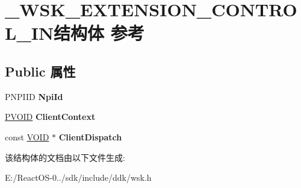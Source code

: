 \hypertarget{struct___w_s_k___e_x_t_e_n_s_i_o_n___c_o_n_t_r_o_l___i_n}{}\section{\+\_\+\+W\+S\+K\+\_\+\+E\+X\+T\+E\+N\+S\+I\+O\+N\+\_\+\+C\+O\+N\+T\+R\+O\+L\+\_\+\+I\+N结构体 参考}
\label{struct___w_s_k___e_x_t_e_n_s_i_o_n___c_o_n_t_r_o_l___i_n}
\subsection*{Public 属性}
\begin{DoxyCompactItemize}
\item 
\mbox{\label{struct___w_s_k___e_x_t_e_n_s_i_o_n___c_o_n_t_r_o_l___i_n_a98210ebe8b8c06548c340551e8f9b88a}} 
P\+N\+P\+I\+ID {\bfseries Npi\+Id}
\item 
\mbox{\label{struct___w_s_k___e_x_t_e_n_s_i_o_n___c_o_n_t_r_o_l___i_n_a6a78e0218d9c5d07c5f74e40bbae2557}} 
\hyperlink{interfacevoid}{P\+V\+O\+ID} {\bfseries Client\+Context}
\item 
\mbox{\label{struct___w_s_k___e_x_t_e_n_s_i_o_n___c_o_n_t_r_o_l___i_n_abd1c3264ee82e9b5da836b9fb04af2d1}} 
const \hyperlink{interfacevoid}{V\+O\+ID} $\ast$ {\bfseries Client\+Dispatch}
\end{DoxyCompactItemize}


该结构体的文档由以下文件生成\+:\begin{DoxyCompactItemize}
\item 
E\+:/\+React\+O\+S-\/0../sdk/include/ddk/wsk.\+h\end{DoxyCompactItemize}
